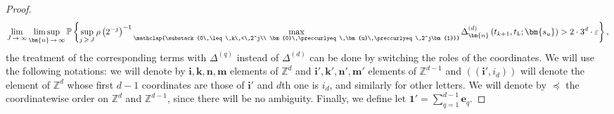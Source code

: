 \documentclass[10pt]{amsart}
\theoremstyle{definition}\newtheorem{defi}[theo]{Definition}\newtheorem{rema}[theo]{Remark}\newtheorem{exam}[theo]{Example}\newtheorem{exem}[theo]{Example}\newtheorem{nota}[theo]{Notation}
\newcommand\PP{\mathbb{P}}
\newcommand\Z{\mathbb{Z}}
\newcommand{\pr}[1]{(#1)}
\newcommand\eps{\varepsilon}
\newcommand{\gr}[1]{\bm{#1}}
\newcommand{\gri}{\bm{i}}
\newcommand{\grn}{\bm{n}}
\newcommand{\grm}{\bm{m}}
\newcommand{\gru}{\bm{u}}
\newcommand{\grk}{\bm{k}}
\newcommand{\imd}{\preccurlyeq}
\begin{document}
\begin{proof}
\begin{equation}
\lim_{J\,\to\,\infty}\limsup_{\grn\,\to\,\infty}
\PP\left\{\sup_{j\,\geqslant\,J}\rho\left(2^{-j}\right)^{-1}
\max_{\mathclap{\substack{0\,\leq\,k\,<\,2^j\\
\gr{0}\,\imd\,\gru\,\imd\,2^j\gr{1}}}} \Delta^{(d)}_{\grn}\left(t_{k+1},t_k;
\gr{s_u}\right)>2\cdot 3^d\cdot \eps\right\},
\end{equation}
the treatment of the corresponding terms with $\Delta^{(q)}$ instead of $\Delta^{(d)}$ can be done by switching the roles of the coordinates. We will use the following notations: we will denote by $\gri,\grk,\grn,\grm$ elements of $\Z^d$ and $\gr{i'},\gr{k'},\gr{n'},\gr{m'}$ elements of $\Z^{d-1}$ and $\pr{\pr{\gr{i'},i_d}}$ will denote the element of $\Z^d$ whose first $d-1$ coordinates are those of $\gr{i'}$ and $d$th one is $i_d$, and similarly for other letters. We will denote by $\imd$ the coordinatewise order on $\Z^d$ and $\Z^{d-1}$, since there will be no ambiguity. Finally, we define let $\gr{1'}=\sum_{q=1}^{d-1}\gr{e}_q$.


\end{proof}
\end{document}
